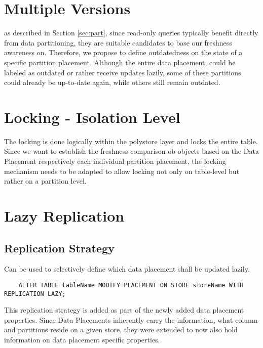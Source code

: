 \section{Multiple Versions}

as described in Section \ref{sec:part}, since read-only queries typically benefit directly from data partitioning, they are suitable candidates to base our freshness awareness on.
Therefore, we propose to define outdatedness on the state of a specific partition placement.
Although the entire data placement, could be labeled as outdated or rather receive updates lazily, some of 
these partitions could already be up-to-date again, while others still remain outdated.




\section{Locking - Isolation Level}


The locking is done logically within the polystore layer and locks the entire table.
Since we want to establish the freshness comparison ob objects based on the Data Placement respectively each individual partition placement, the locking mechanism
needs to be adapted to allow locking not only on table-level but rather on a partition level. 





\section{Lazy Replication}

\subsection{Replication Strategy}
Can be used to selectively define which data placement shall be updated lazily.
\begin{verbatim}
    ALTER TABLE tableName MODIFY PLACEMENT ON STORE storeName WITH REPLICATION LAZY;
\end{verbatim}

This replication strategy is added as part of the newly added data placement properties. Since Data Placements inherently carry the information, what column and partitions reside
on a given store, they were extended to now also hold information on data placement specific properties.



